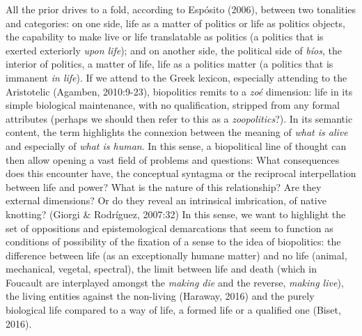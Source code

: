 \documentclass[a4paper,]{scrartcl}
\begin{document}
All the prior drives to a fold, according to Espósito (2006), between
two tonalities and categories: on one side, life as a matter of politics
or life as politics objects, the capability to make live or life
translatable as politics (a politics that is exerted exteriorly
\emph{upon life}); and on another side, the political side of
\emph{bíos}, the interior of politics, a matter of life, life as a
politics matter (a politics that is immanent \emph{in life}). If we
attend to the Greek lexicon, especially attending to the Aristotelic
(Agamben, 2010:9-23), biopolitics remits to a \emph{zoé} dimension: life
in its simple biological maintenance, with no qualification, stripped
from any formal attributes (perhaps we should then refer to this as a
\emph{zoopolitics}?). In its semantic content, the term highlights the
connexion between the meaning of \emph{what is alive} and especially of
\emph{what is human}. In this sense, a biopolitical line of thought can
then allow opening a vast field of problems and questions: What
consequences does this encounter have, the conceptual syntagma or the
reciprocal interpellation between life and power? What is the nature of
this relationship? Are they external dimensions? Or do they reveal an
intrinsical imbrication, of native knotting? (Giorgi \& Rodríguez,
2007:32) In this sense, we want to highlight the set of oppositions and
epistemological demarcations that seem to function as conditions of
possibility of the fixation of a sense to the idea of biopolitics: the
difference between life (as an exceptionally humane matter) and no life
(animal, mechanical, vegetal, spectral), the limit between life and
death (which in Foucault are interplayed amongst the \emph{making die}
and the reverse, \emph{making live}), the living entities against the
non-living (Haraway, 2016) and the purely biological life compared to a
way of life, a formed life or a qualified one (Biset, 2016).
\end{document}
